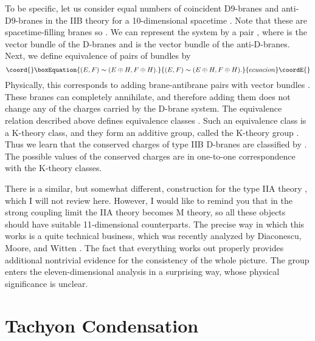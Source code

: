 \documentclass[a4paper,12pt]{article}
\begin{document}
To be specific, let us consider equal numbers of coincident
D9-branes  and anti-D9-branes in the IIB theory for a
10-dimensional spacetime \coordHE{}.  Note that these are
spacetime-filling branes so \coordHE{}.  We can represent the system
by a pair \coordHE{}, where \coordHE{} is the vector bundle of the D-branes
and \coordHE{} is the vector bundle of the anti-D-branes.  Next, we
define equivalence of pairs of bundles by
\begin{equation}\coord{}\boxEquation{
(E,F) \sim (E \oplus H, F \oplus H).
}{
(E,F) \sim (E \oplus H, F \oplus H).
}{ecuacion}\coordE{}\end{equation}
Physically, this corresponds to adding brane-antibrane pairs with
vector bundles \coordHE{}. These branes can completely annihilate,
and therefore adding them does not change any of the charges
carried by the D-brane system. The equivalence relation described
above defines equivalence classes \myHighlight{$[(E,F)]$}\coordHE{}. Such an equivalence
class is a K-theory class, and they form an additive group, called
the K-theory group \coordHE{}. Thus we learn that the conserved
charges of type IIB D-branes are classified by \coordHE{}. The
possible values of the conserved charges are in one-to-one
correspondence with the K-theory classes.

There is a similar, but somewhat different, construction for the
type IIA theory \cite{PH}, which I will not review here.  However, I would
like to remind you that in the strong coupling limit the IIA
theory becomes M theory, so all these objects should have suitable
11-dimensional counterparts.  The precise way in which this works
is a quite technical business, which was recently analyzed by
Diaconescu, Moore, and Witten \cite{DMW}.  The fact that everything works out
properly provides additional nontrivial evidence for the
consistency of the whole picture.  The group \coordHE{} enters the
eleven-dimensional analysis in a surprising way, whose physical
significance is unclear.

\section{Tachyon Condensation}
\end{document}

